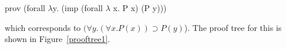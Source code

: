 \documentclass{acmconf}
\newcommand{\impl}{\supset}
\newcommand{\impI}{\textsf{impI}}
\newcommand{\allI}{\textsf{allI}}
\newcommand{\allE}{\textsf{allE}}
\newcommand{\impE}{\textsf{impE}}
\newcommand{\vd}{\vdash}
\begin{document}
\begin{code}
prov (forall $\lambda$y. (imp (forall $\lambda$ x. P x) (P y)))  
\end{code}


which corresponds to $(\forall y. (\forall x.P(x)) \impl P(y)$).  The
proof tree for this is shown in Figure~\ref{prooftree1}.


\end{document}
